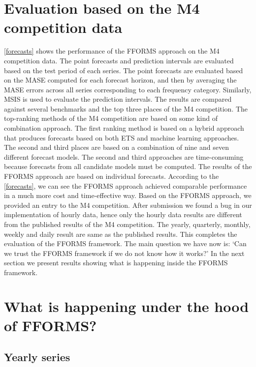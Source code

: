 \documentclass[11pt,a4paper,]{article}
\begin{document}
\hypertarget{results1}{%
\section{Evaluation based on the M4 competition data}\label{results1}}

\autoref{forecasts} shows the performance of the FFORMS approach on the M4 competition data. The point forecasts and prediction intervals are evaluated based on the test period of each series. The point forecasts are evaluated based on the MASE computed for each forecast horizon, and then by averaging the MASE errors across all series corresponding to each frequency category. Similarly, MSIS is used to evaluate the prediction intervals. The results are compared against several benchmarks and the top three places of the M4 competition. The top-ranking methods of the M4 competition are based on some kind of combination approach. The first ranking method is based on a hybrid approach that produces forecasts based on both ETS and machine learning approaches. The second and third places are based on a combination of nine and seven different forecast models. The second and third approaches are time-consuming because forecasts from all candidate models must be computed. The results of the FFORMS approach are based on individual forecasts. According to the \autoref{forecasts}, we can see the FFORMS approach achieved comparable performance in a much more cost and time-effective way. Based on the FFORMS approach, we provided an entry to the M4 competition. After submission we found a bug in our implementation of hourly data, hence only the hourly data results are different from the published results of the M4 competition. The yearly, quarterly, monthly, weekly and daily result are same as the published results. This completes the evaluation of the FFORMS framework. The main question we have now is: `Can we trust the FFORMS framework if we do not know how it works?' In the next section we present results showing what is happening inside the FFORMS framework.

\hypertarget{results2}{%
\section{What is happening under the hood of FFORMS?}\label{results2}}

\hypertarget{yearly-series}{%
\subsection{Yearly series}\label{yearly-series}}
\end{document}
